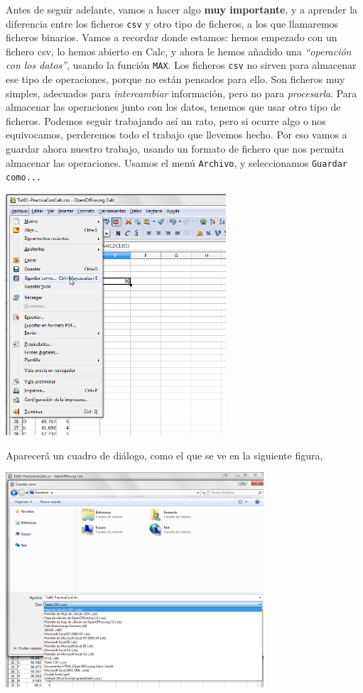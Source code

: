 \documentclass[10pt,a4paper]{article}\usepackage[]{graphicx}\usepackage[]{color}
\begin{document}
Antes de seguir adelante, vamos a hacer algo {\bf muy importante}, y a aprender la diferencia entre los ficheros {\tt csv} y otro tipo de ficheros, a los que llamaremos {\sf ficheros binarios}. Vamos a recordar donde estamos: hemos empezado con un fichero csv, lo hemos abierto en Calc, y ahora le hemos añadido una {\em ``operación con los datos''}, usando la función {\tt MAX}. Los ficheros {\tt csv} no sirven para almacenar ese tipo de operaciones, porque no están pensados para ello. Son ficheros muy simples, adecuados para {\em intercambiar} información, pero no para {\em procesarla}. Para almacenar las operaciones junto con los datos, tenemos que usar otro tipo de ficheros. Podemos seguir trabajando así un rato, pero si ocurre algo o nos equivocamos, perderemos todo el trabajo que llevemos hecho. Por eso vamos a guardar ahora nuestro trabajo, usando un formato de fichero que nos permita almacenar las operaciones.  Usamos el menú {\tt Archivo}, y seleccionamos {\tt Guardar como...}
    \begin{center}
    \includegraphics[height=9cm]{../fig/Tut01-Calc-tablaFrec-07.png}
    \end{center}
Aparecerá un cuadro de diálogo, como el que se ve en la siguiente figura,
    \begin{center}
    \includegraphics[height=8cm]{../fig/Tut01-Calc-tablaFrec-08.png}
    \end{center}
\end{document}

